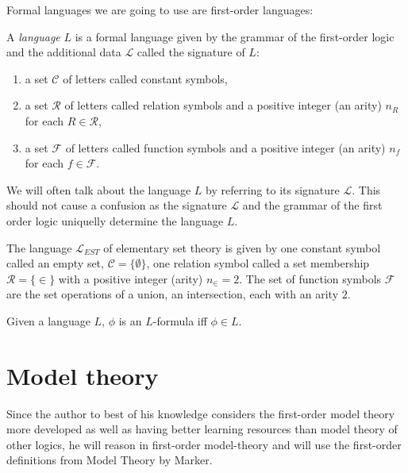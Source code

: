 Formal languages we are going to use are first-order languages:
\begin{defn}
A \emph{language} $L$ is a formal language given by the grammar of the first-order logic and the additional data $\mathcal{L}$ called the signature of $L$:
\begin{enumerate}
\item a set $\mathcal{C}$ of letters called constant symbols,
\item a set $\mathcal{R}$ of letters called relation symbols and a positive integer (an arity) $n_R$ for each $R \in \mathcal{R}$,
\item a set $\mathcal{F}$ of letters called function symbols and a positive integer (an arity) $n_f$ for each $f \in \mathcal{F}$.
\end{enumerate}
\end{defn}

\begin{remark}
We will often talk about the language $L$ by referring to its signature $\mathcal{L}$. This should not cause a confusion as the signature $\mathcal{L}$ and the grammar of the first order logic uniquelly determine the language $L$.
\end{remark}

\begin{exmp}
The language $\mathcal{L}_{EST}$ of elementary set theory is given by one constant symbol called an empty set, $\mathcal{C}=\{\emptyset\}$, one relation symbol called a set membership $\mathcal{R}=\{\in\}$ with a positive integer (arity) $n_{\in}=2$. The set of function symbols $\mathcal{F}$ are the set operations of a union, an intersection, each with an arity $2$.
\end{exmp}

\begin{defn}
Given a language $L$, $\phi$ is an $L$-formula iff $\phi \in L$.
\end{defn}

\section{Model theory\cite{marker2002}}
Since the author to best of his knowledge considers the first-order model theory more developed as well as having better learning resources than model theory  of other logics, he will reason in first-order model-theory and will use the first-order definitions from Model Theory by Marker\cite{marker2002}.

